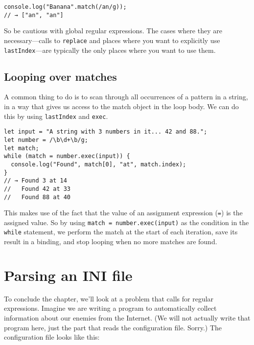 \begin{lstlisting}
console.log("Banana".match(/an/g));
// → ["an", "an"]
\end{lstlisting}
\noindent

So be cautious with global regular expressions. The cases where they are necessary—calls to \lstinline`replace` and places where you want to explicitly use \lstinline`lastIndex`—are typically the only places where you want to use them.

\subsection{Looping over matches}

A common thing to do is to scan through all occurrences of a pattern in a string, in a way that gives us access to the match object in the loop body. We can do this by using \lstinline`lastIndex` and \lstinline`exec`.

\begin{lstlisting}
let input = "A string with 3 numbers in it... 42 and 88.";
let number = /\b\d+\b/g;
let match;
while (match = number.exec(input)) {
  console.log("Found", match[0], "at", match.index);
}
// → Found 3 at 14
//   Found 42 at 33
//   Found 88 at 40
\end{lstlisting}
\noindent{}

This makes use of the fact that the value of an assignment expression (\lstinline`=`) is the assigned value. So by using \lstinline`match = number.exec(input)` as the condition in the \lstinline`while` statement, we perform the match at the start of each iteration, save its result in a binding, and stop looping when no more matches are found.

\label{regexp.ini}\section{Parsing an INI file}

To conclude the chapter, we'll look at a problem that calls for regular expressions. Imagine we are writing a program to automatically collect information about our enemies from the Internet. (We will not actually write that program here, just the part that reads the configuration file. Sorry.) The configuration file looks like this:

